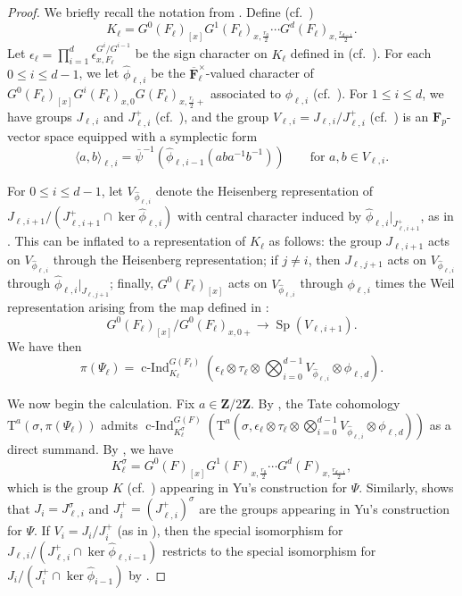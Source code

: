 \documentclass[reqno]{amsart}
\numberwithin{equation}{subsection}
\newcommand{\F}{\mathbf{F}}
\newcommand{\Z}{\mathbf{Z}}
\newcommand{\ol}[1]{\overline{#1}}
\newcommand{\wh}[1]{\widehat{#1}}
\DeclareMathOperator{\Sp}{Sp}
\DeclareMathOperator{\cInd}{c-Ind}
\newcommand{\rT}{\ensuremath{\mathrm{T}}\xspace}
\theoremstyle{remark}
\numberwithin{equation}{subsection}
\numberwithin{figure}{subsection}
\begin{document}
\begin{proof}
We briefly recall the notation from \cite[\S 6]{CF26a}. Define (cf.\ \cite[(6.2.1)]{CF26a}) 
\[
K_\ell = G^0(F_\ell)_{[x]}G^1(F_\ell)_{x, \frac{r_0}{2}} \cdots G^d(F_\ell)_{x, \frac{r_{d-1}}{2}}.
\]
Let $\epsilon_\ell = \prod_{i=1}^d \epsilon_{x,F_\ell}^{G^i/G^{i-1}}$ be the sign character on $K_\ell$ defined in \cite{FKS23} (cf.\ \cite[\S 6.5]{CF26a}). For each $0\leq i\leq d-1$, we let $\wh \phi_{\ell,i}$ be the $\ol\F_\ell^\times$-valued character of $G^0(F_\ell)_{[x]}G^i(F_\ell)_{x,0}G(F_\ell)_{x,\frac{r_i}{2}+}$ associated to $\phi_{\ell,i}$ (cf.\ \cite[\S 6.2]{CF26a}). For $1\leq i\leq d$, we have groups $J_{\ell,i}$ and $J_{\ell,i}^+$ (cf.\ \cite[Lemma~6.4.4]{CF26a}), and the group $V_{\ell,i} = J_{\ell,i}/J_{\ell,i}^+$ (cf.\ \cite[Lemma~6.3.1]{CF26a}) is an $\F_p$-vector space equipped with a symplectic form 
\[
\langle a, b\rangle_{\ell,i} = \ol\psi^{-1}(\wh\phi_{\ell,i-1}(aba^{-1}b^{-1})) \qquad  \text{for $a, b \in V_{\ell,i}$.}
\]

For $0\leq i\leq d-1$, let $V_{\wh\phi_{\ell,i}}$ denote the Heisenberg representation of $J_{\ell,i+1}/(J_{\ell,i+1}^+ \cap \ker \wh\phi_{\ell,i})$ with central character induced by $\wh\phi_{\ell,i}|_{J_{\ell,i+1}^+}$, as in \cite[\S 6.3]{CF26a}. This can be inflated to a representation of $K_\ell$ as follows: the group $J_{\ell,i+1}$ acts on $V_{\wh\phi_{\ell,i}}$ through the Heisenberg representation; if $j \neq i$, then $J_{\ell,j+1}$ acts on $V_{\wh\phi_{\ell,i}}$ through $\wh\phi_{\ell,i}|_{J_{\ell,j+1}}$; finally, $G^0(F_\ell)_{[x]}$ acts on $V_{\wh\phi_{\ell,i}}$ through $\phi_{\ell,i}$ times the Weil representation arising from the map defined in \cite[\S 6.3]{CF26a}:
\[
G^0(F_\ell)_{[x]}/G^0(F_\ell)_{x,0+} \to \Sp(V_{\ell,i+1}).
\]
We have then
\[
\pi(\Psi_\ell) = \cInd_{K_\ell}^{G(F_\ell)}(\epsilon_\ell \otimes \tau_\ell \otimes \bigotimes_{i=0}^{d-1} V_{\wh\phi_{\ell,i}} \otimes \phi_{\ell,d}).
\]

We now begin the calculation. Fix $a \in \Z/2\Z$. By \cite[Lemma~5.2.1]{Cot26b}, the Tate cohomology $\rT^a(\sigma, \pi(\Psi_\ell))$ admits $\cInd_{K_\ell^\sigma}^{G(F)}(\rT^a(\sigma, \epsilon_\ell \otimes \tau_\ell \otimes \bigotimes_{i=0}^{d-1} V_{\wh\phi_{\ell,i}} \otimes \phi_{\ell,d}))$ as a direct summand. By \cite[Lemma~6.4.2(2)]{CF26a}, we have
\[
K_\ell^\sigma = G^0(F)_{[x]}G^1(F)_{x,\frac{r_0}{2}} \cdots G^d(F)_{x,\frac{r_{d-1}}{2}},
\]
which is the group $K$ (cf.\ \cite[(6.2.1)]{CF26a}) appearing in Yu's construction for $\Psi$. Similarly, \cite[Lemma~6.4.4(2)]{CF26a} shows that $J_i = J_{\ell,i}^\sigma$ and $J_i^+ = (J_{\ell,i}^+)^\sigma$ are the groups appearing in Yu's construction for $\Psi$. If $V_i = J_i/J_i^+$ (as in \cite[Lemma~6.3.1]{CF26a}), then the special isomorphism for $J_{\ell,i}/(J_{\ell,i}^+ \cap \ker \wh\phi_{\ell,i-1})$ restricts to the special isomorphism for $J_i/(J_i^+ \cap \ker \wh\phi_{i-1})$ by \cite[Lemma~6.4.5(2)]{CF26a}.


\end{proof}
\end{document}
